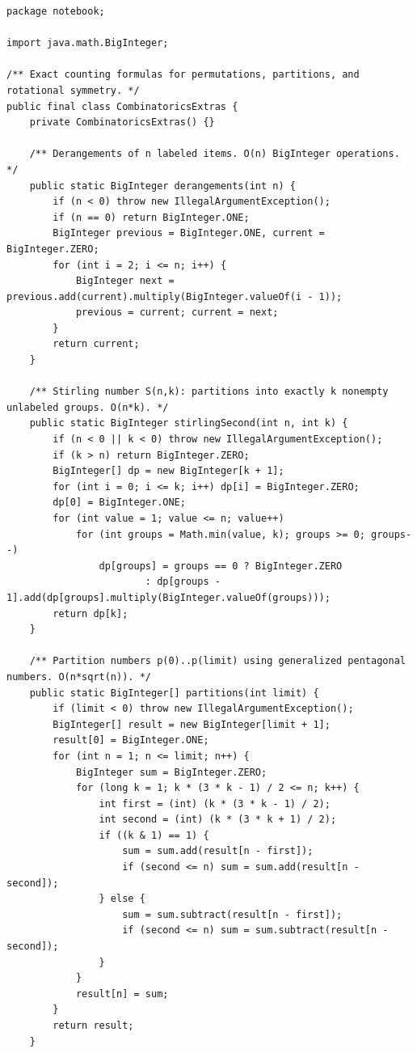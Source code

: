 \documentclass[10pt,letterpaper]{article}
\begin{document}
\begin{lstlisting}
package notebook;

import java.math.BigInteger;

/** Exact counting formulas for permutations, partitions, and rotational symmetry. */
public final class CombinatoricsExtras {
    private CombinatoricsExtras() {}

    /** Derangements of n labeled items. O(n) BigInteger operations. */
    public static BigInteger derangements(int n) {
        if (n < 0) throw new IllegalArgumentException();
        if (n == 0) return BigInteger.ONE;
        BigInteger previous = BigInteger.ONE, current = BigInteger.ZERO;
        for (int i = 2; i <= n; i++) {
            BigInteger next = previous.add(current).multiply(BigInteger.valueOf(i - 1));
            previous = current; current = next;
        }
        return current;
    }

    /** Stirling number S(n,k): partitions into exactly k nonempty unlabeled groups. O(n*k). */
    public static BigInteger stirlingSecond(int n, int k) {
        if (n < 0 || k < 0) throw new IllegalArgumentException();
        if (k > n) return BigInteger.ZERO;
        BigInteger[] dp = new BigInteger[k + 1];
        for (int i = 0; i <= k; i++) dp[i] = BigInteger.ZERO;
        dp[0] = BigInteger.ONE;
        for (int value = 1; value <= n; value++)
            for (int groups = Math.min(value, k); groups >= 0; groups--)
                dp[groups] = groups == 0 ? BigInteger.ZERO
                        : dp[groups - 1].add(dp[groups].multiply(BigInteger.valueOf(groups)));
        return dp[k];
    }

    /** Partition numbers p(0)..p(limit) using generalized pentagonal numbers. O(n*sqrt(n)). */
    public static BigInteger[] partitions(int limit) {
        if (limit < 0) throw new IllegalArgumentException();
        BigInteger[] result = new BigInteger[limit + 1];
        result[0] = BigInteger.ONE;
        for (int n = 1; n <= limit; n++) {
            BigInteger sum = BigInteger.ZERO;
            for (long k = 1; k * (3 * k - 1) / 2 <= n; k++) {
                int first = (int) (k * (3 * k - 1) / 2);
                int second = (int) (k * (3 * k + 1) / 2);
                if ((k & 1) == 1) {
                    sum = sum.add(result[n - first]);
                    if (second <= n) sum = sum.add(result[n - second]);
                } else {
                    sum = sum.subtract(result[n - first]);
                    if (second <= n) sum = sum.subtract(result[n - second]);
                }
            }
            result[n] = sum;
        }
        return result;
    }


\end{lstlisting}
\end{document}
